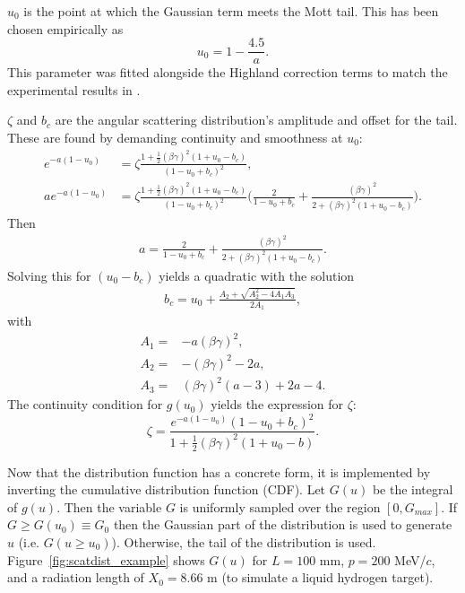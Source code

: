 $u_0$ is the point at which the Gaussian term meets the Mott tail. This has been chosen empirically as
\begin{equation}\label{eqn:cosyu0}
u_0=1-\frac{4.5}{a}.
\end{equation}
This parameter was fitted alongside the Highland correction terms to match the experimental results in \cite{muscat}.

$\zeta$ and $b_c$ are the angular scattering distribution's amplitude and offset for the tail. These are found by demanding continuity and smoothness at $u_0$:
\begin{align*}
e^{-a(1-u_0)}&=\zeta\frac{1+\frac{1}{2}(\beta\gamma)^2(1+u_0-b_c)}{(1-u_0+b_c)^2},\\
ae^{-a(1-u_0)}&=\zeta\frac{1+\frac{1}{2}(\beta\gamma)^2(1+u_0-b_c)}{(1-u_0+b_c)^2} \Big(\frac{2}{1-u_0+b_c}+\frac{(\beta\gamma)^2}{2+(\beta\gamma)^2(1+u_0-b_c)}\Big).
\end{align*}
Then
\begin{align*}
a=\frac{2}{1-u_0+b_c}+\frac{(\beta\gamma)^2}{2+(\beta\gamma)^2(1+u_0-b_c)}.
\end{align*}
Solving this for $(u_0-b_c)$ yields a quadratic with the solution
\begin{align} \label{eqn:cosybc}
b_c=u_0+\frac{A_2 + \sqrt{A_2 ^2 - 4A_1 A_3}}{2A_1},
\end{align}
with
\begin{align*}
A_1=&-a(\beta\gamma)^2,\\
A_2=&-(\beta\gamma)^2-2a,\\
A_3=&(\beta\gamma)^2(a-3)+2a-4.
\end{align*}
The continuity condition for $g(u_0)$ yields the expression for $\zeta$:
\begin{equation}\label{eqn:cosyzeta}
\zeta=\frac{e^{-a(1-u_0)}(1-u_0+b_c)^2}{1+\frac{1}{2}(\beta\gamma)^2(1+u_0-b)}.
\end{equation}

Now that the distribution function has a concrete form, it is implemented by inverting the cumulative distribution function (CDF).  Let $G(u)$ be the integral of $g(u)$. Then the variable $G$ is uniformly sampled over the region $[0,G_{max}]$. If $G\geq G(u_0) \equiv G_0$ then the Gaussian part of the distribution is used to generate $u$ (i.e. $G(u\geq u_0)$). Otherwise, the tail of the distribution is used. Figure~\ref{fig:scatdist_example} shows $G(u)$ for $L=100$ mm, $p=200$ MeV/$c$, and a radiation length of $X_0 = 8.66$ m (to simulate a liquid hydrogen target).


